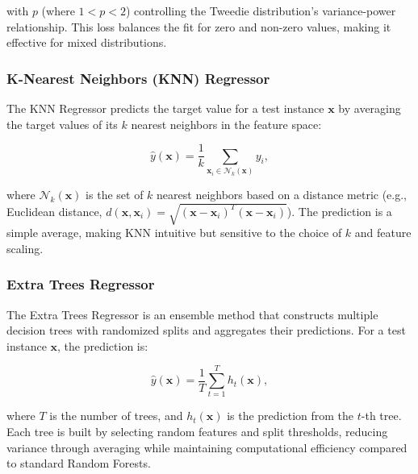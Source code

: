 with \( p \) (where \( 1 < p < 2 \)) controlling the Tweedie distribution's variance-power relationship. This loss balances the fit for zero and non-zero values, making it effective for mixed distributions.

\subsubsection{K-Nearest Neighbors (KNN) Regressor}

The KNN Regressor \citep{fix1951discriminatory,hastie2009elements} predicts the target value for a test instance \( \mathbf{x} \) by averaging the target values of its \( k \) nearest neighbors in the feature space:

\begin{equation}
\hat{y}(\mathbf{x}) = \frac{1}{k} \sum_{\mathbf{x}_i \in \mathcal{N}_k(\mathbf{x})} y_i,    
\end{equation}


where \( \mathcal{N}_k(\mathbf{x}) \) is the set of \( k \) nearest neighbors based on a distance metric (e.g., Euclidean distance, \( d(\mathbf{x}, \mathbf{x}_i) = \sqrt{(\mathbf{x} - \mathbf{x}_i)^T (\mathbf{x} - \mathbf{x}_i)} \)). The prediction is a simple average, making KNN intuitive but sensitive to the choice of \( k \) and feature scaling.

\subsubsection{Extra Trees Regressor}

The Extra Trees Regressor \citep{geurts2006extremely} is an ensemble method that constructs multiple decision trees with randomized splits and aggregates their predictions. For a test instance \( \mathbf{x} \), the prediction is:

\begin{equation}
\hat{y}(\mathbf{x}) = \frac{1}{T} \sum_{t=1}^T h_t(\mathbf{x}), 
\end{equation}


where \( T \) is the number of trees, and \( h_t(\mathbf{x}) \) is the prediction from the \( t \)-th tree. Each tree is built by selecting random features and split thresholds, reducing variance through averaging while maintaining computational efficiency compared to standard Random Forests.


